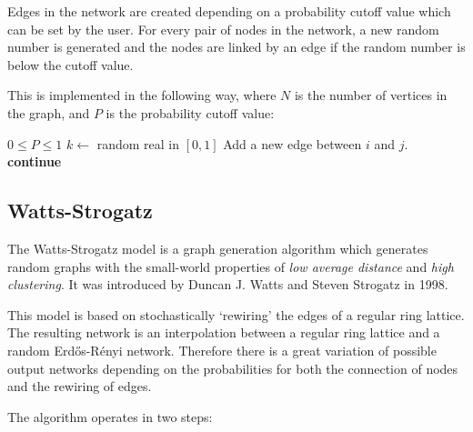 \documentclass[a4paper,11pt,titlepage]{article}
\begin{document}
Edges in the network are created depending on a probability cutoff
value which can be set by the user. For every pair of nodes in the
network, a new random number is generated and the nodes are linked
by an edge if the random number is below the cutoff value.

This is implemented in the following way, where $N$ is the number of vertices
in the graph, and $P$ is the probability cutoff value:
\begin{algorithmic}
  \REQUIRE $0 \leq P \leq 1$
      \STATE $k \gets $ random real in $[0, 1]$
        \STATE Add a new edge between $i$ and $j$.
      \ELSE
        \STATE \textbf{continue}
      \ENDIF
    \ENDFOR
  \ENDFOR
\end{algorithmic}

\subsection{Watts-Strogatz}
The Watts-Strogatz model is a graph generation algorithm which
generates random graphs with the small-world properties of
\emph{low average distance} and \emph{high clustering}.
It was introduced by Duncan J. Watts and Steven Strogatz in 1998.

This model is based on stochastically `rewiring' the edges of a
regular ring lattice. The resulting network is an interpolation
between a regular ring lattice and a random Erd\H{o}s-R\'{e}nyi
network. Therefore there is a great variation of possible output
networks depending on the probabilities for both the connection
of nodes and the rewiring of edges.

The algorithm operates in two steps:
\end{document}
